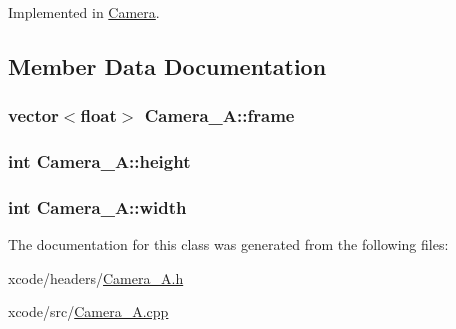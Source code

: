 Implemented in \hyperlink{class_camera_af930ce1f46c9f5af3bd5e5bbff6b5022}{Camera}.



\subsection{Member Data Documentation}
\hypertarget{class_camera___a_a062e331c0b3bc525ba2f2724008d3d20}{
\subsubsection[{frame}]{\setlength{\rightskip}{0pt plus 5cm}vector$<$float$>$ Camera\-\_\-\-A\-::frame\hspace{0.3cm}{\ttfamily [protected]}}}\label{class_camera___a_a062e331c0b3bc525ba2f2724008d3d20}
\hypertarget{class_camera___a_af2d2b7eedefafea58af3467325f4214e}{
\subsubsection[{height}]{\setlength{\rightskip}{0pt plus 5cm}int Camera\-\_\-\-A\-::height\hspace{0.3cm}{\ttfamily [protected]}}}\label{class_camera___a_af2d2b7eedefafea58af3467325f4214e}
\hypertarget{class_camera___a_abe6c7a2c84c368e8e8dd366444490953}{
\subsubsection[{width}]{\setlength{\rightskip}{0pt plus 5cm}int Camera\-\_\-\-A\-::width\hspace{0.3cm}{\ttfamily [protected]}}}\label{class_camera___a_abe6c7a2c84c368e8e8dd366444490953}


The documentation for this class was generated from the following files\-:\begin{DoxyCompactItemize}
\item 
xcode/headers/\hyperlink{_camera___a_8h}{Camera\-\_\-\-A.\-h}\item 
xcode/src/\hyperlink{_camera___a_8cpp}{Camera\-\_\-\-A.\-cpp}\end{DoxyCompactItemize}
